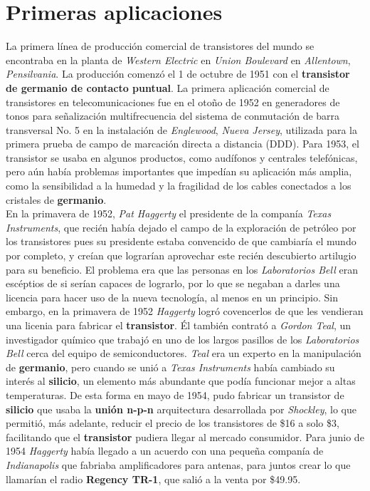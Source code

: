 \section{Primeras aplicaciones}
La primera línea de producción comercial de transistores del mundo se encontraba en la planta de \emph{Western Electric} en \emph{Union Boulevard}
en \emph{Allentown}, \emph{Pensilvania}. La producción comenzó el 1 de octubre de 1951 con el \textbf{transistor de germanio de contacto puntual}.
La primera aplicación comercial de transistores en telecomunicaciones fue en el otoño de 1952 en generadores de tonos para señalización multifrecuencia
del sistema de conmutación de barra transversal No. 5 en la instalación de \emph{Englewood}, \emph{Nueva Jersey}, utilizada para la primera prueba de
campo de marcación directa a distancia (DDD). Para 1953, el transistor se usaba en algunos productos, como audífonos y centrales telefónicas, pero aún
había problemas importantes que impedían su aplicación más amplia, como la sensibilidad a la humedad y la fragilidad de los cables conectados a los
cristales de \textbf{germanio}.\\ 
En la primavera de 1952, \emph{Pat Haggerty} el presidente de la companía \emph{Texas Instruments}, que recién había dejado el campo de la exploración
de petróleo por los transistores pues su presidente estaba convencido de que cambiaría el mundo por completo, y creían que lograrían aprovechar
este recién descubierto artilugio para su beneficio. El problema era que las personas en los \emph{Laboratorios Bell} eran escéptios de si serían capaces
de lograrlo, por lo que se negaban a darles una licencia para hacer uso de la nueva tecnología, al menos en un principio. Sin embargo, en la primavera de
1952 \emph{Haggerty} logró covencerlos de que les vendieran una licenia para fabricar el \textbf{transistor}. Él también contrató a \emph{Gordon Teal},
un investigador químico que trabajó en uno de los largos pasillos de los \emph{Laboratorios Bell} cerca del equipo de semiconductores. \emph{Teal} era
un experto en la manipulación de \textbf{germanio}, pero cuando se unió a \emph{Texas Instruments} había cambiado su interés al \textbf{silicio}, un
elemento más abundante que podía funcionar mejor a altas temperaturas. De esta forma en mayo de 1954, pudo fabricar un transistor de \textbf{silicio} que usaba la
\textbf{unión n-p-n} arquitectura desarrollada por \emph{Shockley}, lo que permitió, más adelante, reducir el precio de los transistores de \$16 a solo \$3,
facilitando que el \textbf{transistor} pudiera llegar al mercado consumidor. Para junio de 1954 \emph{Haggerty} había llegado a un acuerdo con una pequeña 
companía de \emph{Indianapolis} que fabriaba amplificadores para antenas, para juntos crear lo que llamarían el radio \textbf{Regency TR-1}, que salió a la venta 
por \$49.95. \\

